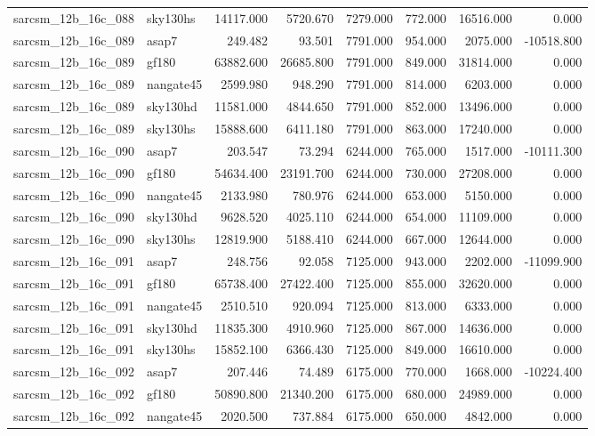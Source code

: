 \begin{tabular}{llrrrrrr}
sarcsm\_12b\_16c\_088 & sky130hs & 14117.000 & 5720.670 & 7279.000 & 772.000 & 16516.000 & 0.000 \\
sarcsm\_12b\_16c\_089 & asap7 & 249.482 & 93.501 & 7791.000 & 954.000 & 2075.000 & -10518.800 \\
sarcsm\_12b\_16c\_089 & gf180 & 63882.600 & 26685.800 & 7791.000 & 849.000 & 31814.000 & 0.000 \\
sarcsm\_12b\_16c\_089 & nangate45 & 2599.980 & 948.290 & 7791.000 & 814.000 & 6203.000 & 0.000 \\
sarcsm\_12b\_16c\_089 & sky130hd & 11581.000 & 4844.650 & 7791.000 & 852.000 & 13496.000 & 0.000 \\
sarcsm\_12b\_16c\_089 & sky130hs & 15888.600 & 6411.180 & 7791.000 & 863.000 & 17240.000 & 0.000 \\
sarcsm\_12b\_16c\_090 & asap7 & 203.547 & 73.294 & 6244.000 & 765.000 & 1517.000 & -10111.300 \\
sarcsm\_12b\_16c\_090 & gf180 & 54634.400 & 23191.700 & 6244.000 & 730.000 & 27208.000 & 0.000 \\
sarcsm\_12b\_16c\_090 & nangate45 & 2133.980 & 780.976 & 6244.000 & 653.000 & 5150.000 & 0.000 \\
sarcsm\_12b\_16c\_090 & sky130hd & 9628.520 & 4025.110 & 6244.000 & 654.000 & 11109.000 & 0.000 \\
sarcsm\_12b\_16c\_090 & sky130hs & 12819.900 & 5188.410 & 6244.000 & 667.000 & 12644.000 & 0.000 \\
sarcsm\_12b\_16c\_091 & asap7 & 248.756 & 92.058 & 7125.000 & 943.000 & 2202.000 & -11099.900 \\
sarcsm\_12b\_16c\_091 & gf180 & 65738.400 & 27422.400 & 7125.000 & 855.000 & 32620.000 & 0.000 \\
sarcsm\_12b\_16c\_091 & nangate45 & 2510.510 & 920.094 & 7125.000 & 813.000 & 6333.000 & 0.000 \\
sarcsm\_12b\_16c\_091 & sky130hd & 11835.300 & 4910.960 & 7125.000 & 867.000 & 14636.000 & 0.000 \\
sarcsm\_12b\_16c\_091 & sky130hs & 15852.100 & 6366.430 & 7125.000 & 849.000 & 16610.000 & 0.000 \\
sarcsm\_12b\_16c\_092 & asap7 & 207.446 & 74.489 & 6175.000 & 770.000 & 1668.000 & -10224.400 \\
sarcsm\_12b\_16c\_092 & gf180 & 50890.800 & 21340.200 & 6175.000 & 680.000 & 24989.000 & 0.000 \\
sarcsm\_12b\_16c\_092 & nangate45 & 2020.500 & 737.884 & 6175.000 & 650.000 & 4842.000 & 0.000 \\

\end{tabular}
